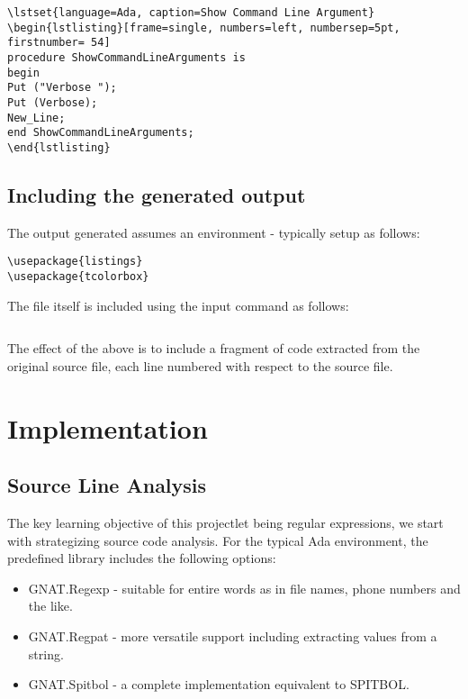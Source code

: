 \documentclass[12pt, a4paper]{article}
\begin{document}
\begin{verbatim}
\lstset{language=Ada, caption=Show Command Line Argument}
\begin{lstlisting}[frame=single, numbers=left, numbersep=5pt, firstnumber= 54]
procedure ShowCommandLineArguments is
begin
Put ("Verbose ");
Put (Verbose);
New_Line;
end ShowCommandLineArguments;
\end{lstlisting}
\end{verbatim}

\subsection{Including the generated output}
The output generated assumes an environment - typically setup as follows:

\begin{verbatim}
\usepackage{listings}
\usepackage{tcolorbox}
\end{verbatim}

The file itself is included using the input command as follows:

\begin{verbatim}

\end{verbatim}

The effect of the above is to include a fragment of code extracted from the original source file, each line numbered with respect to the source file.

\section{Implementation}
\subsection{Source Line Analysis}
The key learning objective of this projectlet being regular expressions, we start with strategizing 
source code analysis. 
For the typical Ada environment, the predefined library includes the following options:

\begin{itemize}
    \item GNAT.Regexp - suitable for entire words as in file names, phone numbers
and the like.

    \item GNAT.Regpat - more versatile support including extracting values from
a string.

    \item GNAT.Spitbol - a complete implementation equivalent to SPITBOL.

\end{itemize}
\end{document}
